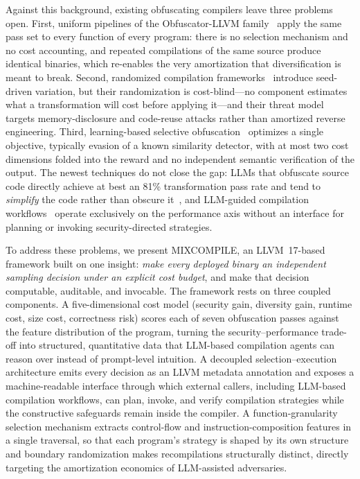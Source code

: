 \documentclass[5p,times,authoryear]{elsarticle}
\theoremstyle{plain}
\theoremstyle{definition}
\theoremstyle{remark}
\begin{document}
Against this background, existing obfuscating compilers leave three problems
open. First, uniform pipelines of the Obfuscator-LLVM
family~\cite{bib8,bib9,bib10,bib11,bib12} apply the same pass set to every
function of every program: there is no selection mechanism and no cost
accounting, and repeated compilations of the same source produce identical
binaries, which re-enables the very amortization that diversification is meant
to break. Second, randomized compilation
frameworks~\cite{homescu2013librando,crane2015readactor,koo2018ccr,franzen2023randcompile}
introduce seed-driven variation, but their randomization is cost-blind---no
component estimates what a transformation will cost before applying it---and
their threat model targets memory-disclosure and code-reuse attacks rather than
amortized reverse engineering. Third, learning-based selective
obfuscation~\cite{bib4,wei2025reinobf} optimizes a single objective, typically
evasion of a known similarity detector, with at most two cost dimensions
folded into the reward and no independent semantic verification of the output.
The newest techniques do not close the gap: LLMs that obfuscate source code
directly achieve at best an 81\% transformation pass rate and tend to
\emph{simplify} the code rather than obscure
it~\cite{detomasi2025simplicity}, and LLM-guided compilation
workflows~\cite{li2026autopass} operate exclusively on the performance axis
without an interface for planning or invoking security-directed strategies.

To address these problems, we present MIXCOMPILE, an LLVM~17-based framework
built on one insight: \emph{make every deployed binary an independent sampling
decision under an explicit cost budget}, and make that decision computable,
auditable, and invocable. The framework rests on three coupled components. A
five-dimensional cost model (security gain, diversity gain, runtime cost, size
cost, correctness risk) scores each of seven obfuscation passes against the
feature distribution of the program, turning the security--performance
trade-off into structured, quantitative data that LLM-based compilation agents
can reason over instead of prompt-level intuition. A decoupled
selection--execution architecture emits every decision as an LLVM metadata
annotation and exposes a machine-readable interface through which external
callers, including LLM-based compilation
workflows, can plan, invoke, and verify compilation strategies while the
constructive safeguards remain inside
the compiler. A function-granularity selection mechanism extracts control-flow
and instruction-composition features in a single traversal, so that each
program's strategy is shaped by its own structure and boundary randomization
makes recompilations structurally distinct, directly targeting the amortization
economics of LLM-assisted adversaries.
\end{document}
